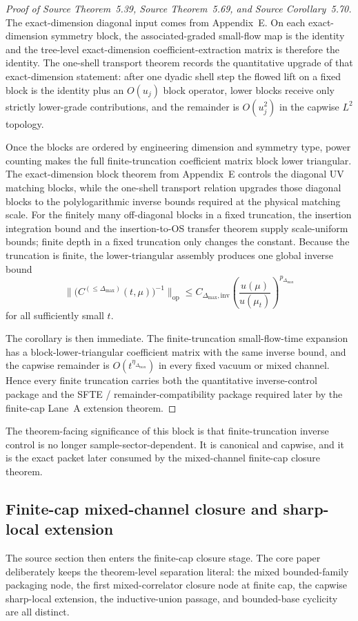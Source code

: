 \begin{proof}[Proof of Source Theorem~5.39, Source Theorem~5.69, and Source Corollary~5.70]
The exact-dimension diagonal input comes from Appendix~E. On each exact-dimension symmetry block, the associated-graded small-flow map is the identity and the tree-level exact-dimension coefficient-extraction matrix is therefore the identity. The one-shell transport theorem records the quantitative upgrade of that exact-dimension statement: after one dyadic shell step the flowed lift on a fixed block is the identity plus an $O(u_j)$ block operator, lower blocks receive only strictly lower-grade contributions, and the remainder is $O(u_j^2)$ in the capwise $L^2$ topology.

Once the blocks are ordered by engineering dimension and symmetry type, power counting makes the full finite-truncation coefficient matrix block lower triangular. The exact-dimension block theorem from Appendix~E controls the diagonal UV matching blocks, while the one-shell transport relation upgrades those diagonal blocks to the polylogarithmic inverse bounds required at the physical matching scale. For the finitely many off-diagonal blocks in a fixed truncation, the insertion integration bound and the insertion-to-OS transfer theorem supply scale-uniform bounds; finite depth in a fixed truncation only changes the constant. Because the truncation is finite, the lower-triangular assembly produces one global inverse bound
\[
\bigl\|\bigl(C^{(\le \Delta_{\max})}(t,\mu)\bigr)^{-1}\bigr\|_{\mathrm{op}}
\le C_{\Delta_{\max},\mathrm{inv}}\left(\frac{u(\mu)}{u(\mu_t)}\right)^{p_{\Delta_{\max}}}
\]
for all sufficiently small $t$.

The corollary is then immediate. The finite-truncation small-flow-time expansion has a block-lower-triangular coefficient matrix with the same inverse bound, and the capwise remainder is $O(t^{\eta_{\Delta_{\max}}})$ in every fixed vacuum or mixed channel. Hence every finite truncation carries both the quantitative inverse-control package and the SFTE / remainder-compatibility package required later by the finite-cap Lane~A extension theorem.
\end{proof}

The theorem-facing significance of this block is that finite-truncation inverse control is no longer sample-sector-dependent. It is canonical and capwise, and it is the exact packet later consumed by the mixed-channel finite-cap closure theorem.

\subsection{Finite-cap mixed-channel closure and sharp-local extension}
The source section then enters the finite-cap closure stage. The core paper deliberately keeps the theorem-level separation literal: the mixed bounded-family packaging node, the first mixed-correlator closure node at finite cap, the capwise sharp-local extension, the inductive-union passage, and bounded-base cyclicity are all distinct.

